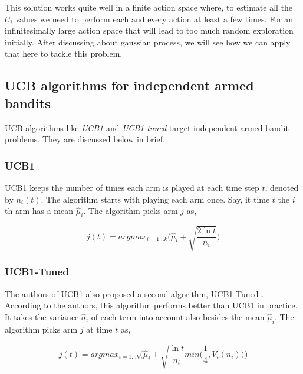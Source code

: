 \documentclass[english]{tktltiki}
\begin{document}
This solution works quite well in a finite action space where, to estimate all the $U_i$ values we need to perform each and every action at least a few times. For an infinitesimally large action space that will lead to too much random exploration initially. After discussing about gaussian process, we will see how we can apply that here to tackle this problem.

\subsection{UCB algorithms for independent armed bandits}

UCB algorithms like \textit{UCB1} and \textit{UCB1-tuned} target independent armed bandit problems. They are discussed below in brief.

\subsubsection{UCB1}

UCB1 \cite{independent_arm_bandits_algorithms} keeps the number of times each arm is played at each time step $t$, denoted by $n_i(t)$. The algorithm starts with playing each arm once. Say, it time $t$ the $i$th arm has a mean $\hat{\mu}_i$. The algorithm picks arm $j$ as,

\begin{equation}
	j(t) = arg max_{i = 1 ... k}\Bigg(\hat{\mu}_i + \sqrt{\frac{2 \ln t}{n_i}}\Bigg)
\end{equation}

\subsubsection{UCB1-Tuned}

The authors of UCB1 also proposed a second algorithm, UCB1-Tuned \cite{independent_arm_bandits_algorithms}. According to the authors, this algorithm performs better than UCB1 in practice. It takes the variance $\hat{\sigma}_i$ of each term into account also besides the mean $\hat{\mu}_i$. The algorithm picks arm $j$ at time $t$ as,

\begin{equation}
	j(t) = arg max_{i = 1 ... k}\Bigg(\hat{\mu}_i + \sqrt{\frac{\ln t}{n_i}min\Big(\frac{1}{4}, V_i(n_i)\Big)}\Bigg)
\end{equation}
\end{document}
